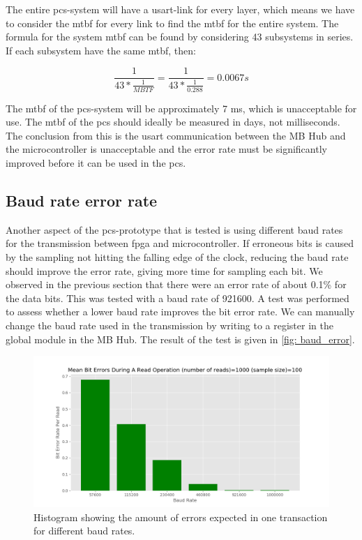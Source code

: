 \documentclass[main.tex]{subfiles}
\begin{document}
The entire \gls{pcs}-system will have a \gls{usart}-link for every layer, which means we have to consider the \gls{mtbf} for every link to find the \gls{mtbf} for the entire system. The formula for the system \gls{mtbf} can be found by considering 43 subsystems in series\cite{mtbf_calc}. If each subsystem have the same \gls{mtbf}, then:

\begin{equation}
    \frac{1}{43*\frac{1}{MBTF}} = \frac{1}{43*\frac{1}{0.288}} = 0.0067s
\end{equation}

The \gls{mtbf} of the \gls{pcs}-system will be approximately 7 ms, which is unacceptable for use. The \gls{mtbf} of the \gls{pcs} should ideally be measured in days, not milliseconds. The conclusion from this is the \gls{usart} communication between the MB Hub and the microcontroller is unacceptable and the error rate must be significantly improved before it can be used in the \gls{pcs}.



\subsection{Baud rate error rate}

Another aspect of the \gls{pcs}-prototype that is tested is using different baud rates for the transmission between \gls{fpga} and microcontroller. If erroneous bits is caused by the sampling not hitting the falling edge of the clock, reducing the baud rate should improve the error rate, giving more time for sampling each bit. We observed in the previous section that there were an error rate of about 0.1\% for the data bits. This was tested with a baud rate of 921600. A test was performed to assess whether a lower baud rate improves the bit error rate. We can manually change the baud rate used in the transmission by writing to a register in the global module in the MB Hub. The result of the test is given in \autoref{fig: baud_error}.

\begin{figure}[!ht]
    \centering
    \includegraphics[width=18cm]{images/baud_error_rate.png}
    \caption{Histogram showing the amount of errors expected in one transaction for different baud rates.}
    \label{fig: baud_error}
\end{figure}
\FloatBarrier
\end{document}

